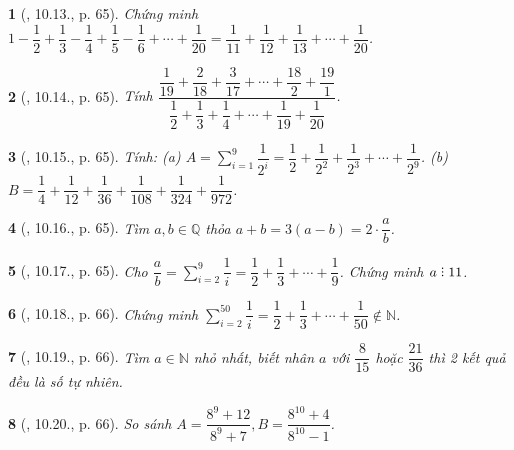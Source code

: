 \documentclass{article}
\newtheorem{baitoan}{}
\DeclareRobustCommand{\divby}{%
	\mathrel{\vbox{\baselineskip.65ex\lineskiplimit0pt\hbox{.}\hbox{.}\hbox{.}}}%
}
\begin{document}
\begin{baitoan}[\cite{TLCT_THCS_Toan_6_so_hoc}, 10.13., p. 65]
	Chứng minh $1 - \dfrac{1}{2} + \dfrac{1}{3} - \dfrac{1}{4} + \dfrac{1}{5} - \dfrac{1}{6} + \cdots + \dfrac{1}{20} = \dfrac{1}{11} + \dfrac{1}{12} + \dfrac{1}{13} + \cdots + \dfrac{1}{20}$.
\end{baitoan}

\begin{baitoan}[\cite{TLCT_THCS_Toan_6_so_hoc}, 10.14., p. 65]
	Tính $\dfrac{\dfrac{1}{19} + \dfrac{2}{18} + \dfrac{3}{17} + \cdots + \dfrac{18}{2} + \dfrac{19}{1}}{\dfrac{1}{2} + \dfrac{1}{3} + \dfrac{1}{4} + \cdots + \dfrac{1}{19} + \dfrac{1}{20}}$.
\end{baitoan}

\begin{baitoan}[\cite{TLCT_THCS_Toan_6_so_hoc}, 10.15., p. 65]
	Tính: (a) $A = \sum_{i=1}^9 \dfrac{1}{2^i} = \dfrac{1}{2} + \dfrac{1}{2^2} + \dfrac{1}{2^3} + \cdots + \dfrac{1}{2^9}$. (b) $B = \dfrac{1}{4} + \dfrac{1}{12} + \dfrac{1}{36} + \dfrac{1}{108} + \dfrac{1}{324} + \dfrac{1}{972}$.
\end{baitoan}

\begin{baitoan}[\cite{TLCT_THCS_Toan_6_so_hoc}, 10.16., p. 65]
	Tìm $a,b\in\mathbb{Q}$ thỏa $a + b = 3(a - b) = 2\cdot\dfrac{a}{b}$.
\end{baitoan}

\begin{baitoan}[\cite{TLCT_THCS_Toan_6_so_hoc}, 10.17., p. 65]
	Cho $\dfrac{a}{b} = \sum_{i=2}^9 \dfrac{1}{i} = \dfrac{1}{2} + \dfrac{1}{3} + \cdots + \dfrac{1}{9}$. Chứng minh $a\divby11$.
\end{baitoan}

\begin{baitoan}[\cite{TLCT_THCS_Toan_6_so_hoc}, 10.18., p. 66]
	Chứng minh $\sum_{i=2}^{50} \dfrac{1}{i} = \dfrac{1}{2} + \dfrac{1}{3} + \cdots + \dfrac{1}{50}\notin\mathbb{N}$.
\end{baitoan}

\begin{baitoan}[\cite{TLCT_THCS_Toan_6_so_hoc}, 10.19., p. 66]
	Tìm $a\in\mathbb{N}$ nhỏ nhất, biết nhân $a$ với $\dfrac{8}{15}$ hoặc $\dfrac{21}{36}$ thì 2 kết quả đều là số tự nhiên.
\end{baitoan}

\begin{baitoan}[\cite{TLCT_THCS_Toan_6_so_hoc}, 10.20., p. 66]
	So sánh $A = \dfrac{8^9 + 12}{8^9 + 7},B = \dfrac{8^{10} + 4}{8^{10} - 1}$.
\end{baitoan}
\end{document}
